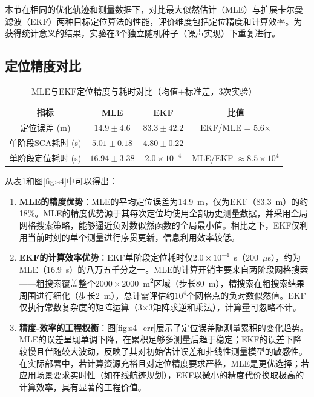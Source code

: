 本节在相同的优化轨迹和测量数据下，对比最大似然估计（MLE）与扩展卡尔曼滤波（EKF）两种目标定位算法的性能，评价维度包括定位精度和计算效率。为获得统计意义的结果，实验在3个独立随机种子（噪声实现）下重复进行。

\subsection{定位精度对比}

\begin{table}[htbp]
\centering
\caption{MLE与EKF定位精度与耗时对比（均值$\pm$标准差，3次实验）}
\label{tab:mle_ekf}
\begin{tabular}{cccc}
\toprule
指标 & MLE & EKF & 比值 \\
\midrule
定位误差 (m)          & $14.9\pm4.6$ & $83.3\pm42.2$ & EKF/MLE = 5.6$\times$ \\
单阶段SCA耗时 (s)     & $5.01\pm0.18$ & $4.80\pm0.22$ & -- \\
单阶段定位耗时 (s)    & $16.94\pm3.38$ & $2.0\times10^{-4}$ & MLE/EKF $\approx 8.5\times10^{4}$ \\
\bottomrule
\end{tabular}
\end{table}

从表\ref{tab:mle_ekf}和图\ref{fig:s4}中可以得出：

\begin{enumerate}
\item \textbf{MLE的精度优势}：MLE的平均定位误差为14.9~m，仅为EKF（83.3~m）的约18\%。MLE的精度优势源于其每次定位均使用全部历史测量数据，并采用全局网格搜索策略，能够逼近负对数似然函数的全局最小值。相比之下，EKF仅利用当前时刻的单个测量进行序贯更新，信息利用效率较低。

\item \textbf{EKF的计算效率优势}：EKF单阶段定位耗时仅$2.0\times10^{-4}$~s（200~$\mu$s），约为MLE（16.9~s）的八万五千分之一。MLE的计算开销主要来自两阶段网格搜索——粗搜索覆盖整个$2000\times2000$~m\textsuperscript{2}区域（步长80~m），精搜索在粗搜索结果周围进行细化（步长2~m），总计需评估约$10^{4}$个网格点的负对数似然值。EKF仅执行常数复杂度的矩阵运算（3$\times$3矩阵求逆和乘法），计算量可忽略不计。

\item \textbf{精度-效率的工程权衡}：图\ref{fig:s4_err}展示了定位误差随测量累积的变化趋势。MLE的误差呈现单调下降，在累积足够多测量后趋于稳定；EKF的误差下降较慢且伴随较大波动，反映了其对初始估计误差和非线性测量模型的敏感性。在实际部署中，若计算资源充裕且对定位精度要求严格，MLE是更优选择；若应用场景要求实时性（如在线航迹规划），EKF以微小的精度代价换取极高的计算效率，具有显著的工程价值。
\end{enumerate}

